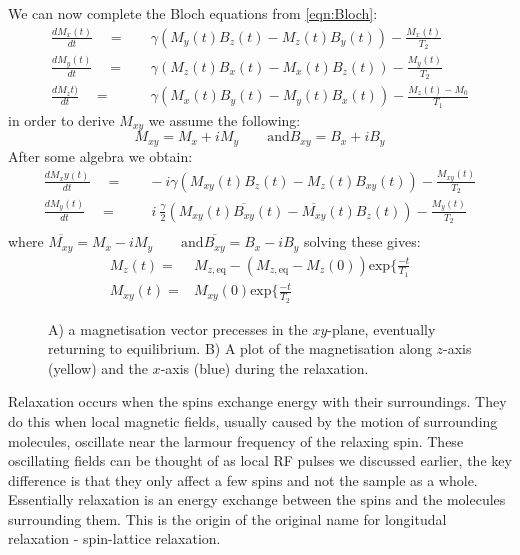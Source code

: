 We can now complete the Bloch equations from \ref{eqn:Bloch}:
\begin{align}
  \frac{dM_x(t)}{dt}\quad=&\quad\gamma(M_y(t)B_z(t)-M_z(t)B_y(t)) - \frac{M_x(t)}{T_2}\\
  \frac{dM_y(t)}{dt}\quad=&\quad\gamma(M_z(t)B_x(t)-M_x(t)B_z(t)) - \frac{M_y(t)}{T_2}\\
  \frac{dM_zt)}{dt}\quad=&\quad\gamma(M_x(t)B_y(t)-M_y(t)B_x(t)) - \frac{M_z(t)-M_0}{T_1}
\end{align}
in order to derive $M_{xy}$ we assume the following:
\begin{equation}
  M_{xy} = M_x + iM_y\qquad\text{and} B_{xy} = B_x + iB_y
\end{equation}
After some algebra we obtain:
\begin{align}
  \frac{dM_xy(t)}{dt}\quad=&\quad-i\gamma(M_{xy}(t)B_z(t)-M_z(t)B_{xy}(t)) - \frac{M_{xy}(t)}{T_2}\\
  \frac{dM_y(t)}{dt}\quad=&\quad~i~\frac{\gamma}{2}(M_{xy}(t)\overline{B_{xy}}(t)-\overline{M_{xy}}(t)B_z(t)) - \frac{M_y(t)}{T_2}\\
\end{align}
where $\overline{M_{xy}} = M_x - iM_y\qquad\text{and} \overline{B_{xy}} = B_x - iB_y$
solving these gives:
\begin{align}
  M_z(t) =& M_{z,\text{eq}} - (M_{z,\text{eq}}-M_z(0))\text{exp}\{\frac{-t}{T_1}\\
  M_{xy}(t) =& M_{xy}(0)\text{exp}\{\frac{-t}{T_2}
\end{align}

\begin{figure}
  \caption{A) a magnetisation vector precesses in the $xy$-plane, eventually returning to equilibrium.
  B) A plot of the magnetisation along $z$-axis (yellow) and the $x$-axis (blue) during the relaxation.}
  \label{fig:t1t2}
\end{figure}

Relaxation occurs when the spins exchange energy with their surroundings. They do
this when local magnetic fields, usually caused by the motion of surrounding molecules, oscillate
near the larmour frequency of the relaxing spin. These oscillating fields can be thought of
as local RF pulses we discussed earlier, the key difference is that they only affect a few spins
and not the sample as a whole. Essentially relaxation is an energy exchange between the
spins and the molecules surrounding them. This is the origin of the original name for longitudal
relaxation - spin-lattice relaxation.
